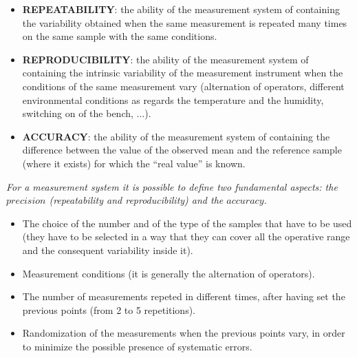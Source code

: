 
\begin{frame}
\begin{small}
\vspace*{.25cm}
\begin{itemize}
 \item \textbf{REPEATABILITY}: the ability of the measurement system of containing the variability obtained when the same measurement is repeated many times on the same sample with the same conditions. 
 \item  \textbf{REPRODUCIBILITY}: the ability of the measurement system of containing the intrinsic variability of the measurement instrument when the conditions of the same measurement vary (alternation of operators, different environmental conditions as regards the temperature and the humidity, switching on of the bench, $\dots$).
 \item \textbf{ACCURACY}: the ability of the measurement system of containing the difference between the value of the observed mean and the reference sample (where it exists) for which the ``real value'' is known.
\end{itemize}
\vspace*{.3cm}
\textit{For a measurement system it is possible to define two fundamental aspects: the {\boldmath$precision$} (repeatability and reproducibility) and the {\boldmath$accuracy$}.}                          \end{small}
\end{frame}




\begin{frame}
\vspace*{.75cm}
\begin{itemize}
 \item The choice of the number and of the type of the samples that have to be used (they have to be selected in a way that they can cover all the operative range and the consequent variability inside it).
 \item Measurement conditions (it is generally the alternation of operators).
 \item The number of measurements repeted in different times, after having set the previous points (from 2 to 5 repetitions).
 \item Randomization of the measurements when the previous points vary, in order to minimize the possible presence of systematic errors.
\end{itemize}
\end{frame}



